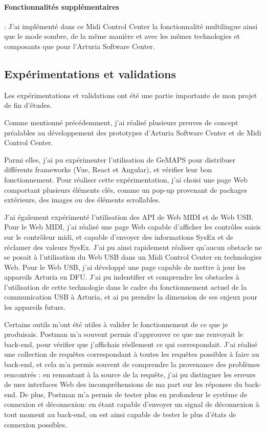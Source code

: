 \documentclass[francais]{rapportPFE}  %
\begin{document}
\paragraph{Fonctionnalités supplémentaires}:
J'ai implémenté dans ce Midi Control Center la fonctionnalité multilingue ainsi que le mode sombre, de la même manière et avec les mêmes technologies et composants que pour l'Arturia Software Center.

\subsection{Expérimentations et validations}

Les expérimentations et validations ont été une partie importante de mon projet de fin d'études.

Comme mentionné précédemment, j'ai réalisé plusieurs preuves de concept préalables au développement des prototypes d'Arturia Software Center et de Midi Control Center.

Parmi elles, j'ai pu expérimenter l'utilisation de GeMAPS pour distribuer différents frameworks (Vue, React et Angular), et vérifier leur bon fonctionnement. Pour réaliser cette expérimentation, j'ai choisi une page Web comportant plusieurs éléments clés, comme un pop-up provenant de packages extérieurs, des images ou des éléments scrollables.

J'ai également expérimenté l'utilisation des API de Web MIDI et de Web USB.
Pour le Web MIDI, j'ai réalisé une page Web capable d'afficher les contrôles saisis sur le contrôleur midi, et capable d'envoyer des informations SysEx et de réclamer des valeurs SysEx. J'ai pu ainsi rapidement réaliser qu'aucun obstacle ne se posait à l'utilisation du Web USB dans un Midi Control Center en technologies Web.
Pour le Web USB, j'ai développé une page capable de mettre à jour les appareils Arturia en DFU. J'ai pu indentifier et comprendre les obstacles à l'utilisation de cette technologie dans le cadre du fonctionnement actuel de la communication USB à Arturia, et ai pu prendre la dimension de ses enjeux pour les appareils futurs.

Certains outils m'ont été utiles à valider le fonctionnement de ce que je produisais. Postman m'a souvent permis d'approuver ce que me renvoyait le back-end, pour vérifier que j'affichais réellement ce qui correspondait. J'ai réalisé une collection de requêtes correspondant à toutes les requêtes possibles à faire au back-end, et cela m'a permis souvent de comprendre la provenance des problèmes rencontrés : en remontant à la source de la requête, j'ai pu distinguer les erreurs de mes interfaces Web des incompréhensions de ma part sur les réponses du back-end. De plus, Postman m'a permis de tester plus en profondeur le système de connexion et déconnexion: en étant capable d'envoyer un signal de déconnexion à tout moment au back-end, on est ainsi capable de tester le plus d'états de connexion possibles.
\end{document}
